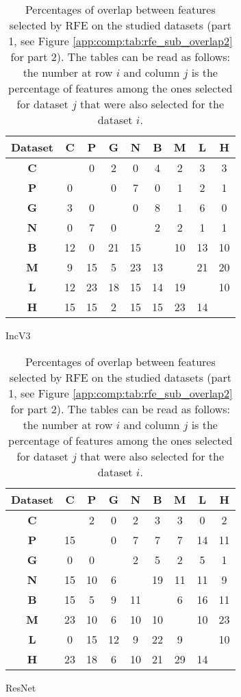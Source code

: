 \begin{table}
  \begin{subtable}[h]{0.45\textwidth}
    \centering
    \begin{tabular}{|c|cccccccc|} 
    \hline
    Dataset & \textbf{C} & \textbf{P} & \textbf{G} & \textbf{N} & \textbf{B} & \textbf{M} & \textbf{L} & \textbf{H}\\
    \hline
    \textbf{C} &   & 0 & 2 & 0 & 4 & 2 & 3 & 3 \\
    \textbf{P} & 0 &   & 0 & 7 & 0 & 1 & 2 & 1 \\
    \textbf{G} & 3 & 0 &   & 0 & 8 & 1 & 6 & 0 \\
    \textbf{N} & 0 & 7 & 0 &   & 2 & 2 & 1 & 1 \\
    \textbf{B} & 12 & 0 & 21 & 15 &   & 10 & 13 & 10 \\
    \textbf{M} & 9 & 15 & 5 & 23 & 13 &   & 21 & 20 \\
    \textbf{L} & 12 & 23 & 18 & 15 & 14 & 19 &   & 10 \\
    \textbf{H} & 15 & 15 & 2 & 15 & 15 & 23 & 14 & \\
    \hline
    \end{tabular}
    \caption{IncV3}
  \end{subtable}

  \begin{subtable}[h]{0.45\textwidth}
    \centering
    \begin{tabular}{|c|cccccccc|} 
    \hline
    Dataset & \textbf{C} & \textbf{P} & \textbf{G} & \textbf{N} & \textbf{B} & \textbf{M} & \textbf{L} & \textbf{H}\\
    \hline
    \textbf{C} &   & 2 & 0 & 2 & 3 & 3 & 0 & 2 \\
    \textbf{P} & 15 &   & 0 & 7 & 7 & 7 & 14 & 11 \\
    \textbf{G} & 0 & 0 &   & 2 & 5 & 2 & 5 & 1 \\
    \textbf{N} & 15 & 10 & 6 &   & 19 & 11 & 11 & 9 \\
    \textbf{B} & 15 & 5 & 9 & 11 &   & 6 & 16 & 11 \\
    \textbf{M} & 23 & 10 & 6 & 10 & 10 &   & 10 & 23 \\
    \textbf{L} & 0 & 15 & 12 & 9 & 22 & 9 &   & 10 \\
    \textbf{H} & 23 & 18 & 6 & 10 & 21 & 29 & 14 & \\
    \hline
    \end{tabular}
    \caption{ResNet}
  \end{subtable} \\

  \caption{Percentages of overlap between features selected by RFE on the studied datasets (part 1, see Figure \ref{app:comp:tab:rfe_sub_overlap2} for part 2). The tables can be read as follows: the number at row $i$ and column $j$ is the percentage of features among the ones selected for dataset $j$ that were also selected for the dataset $i$.}
  \label{app:comp:tab:rfe_sub_overlap}
\end{table}

